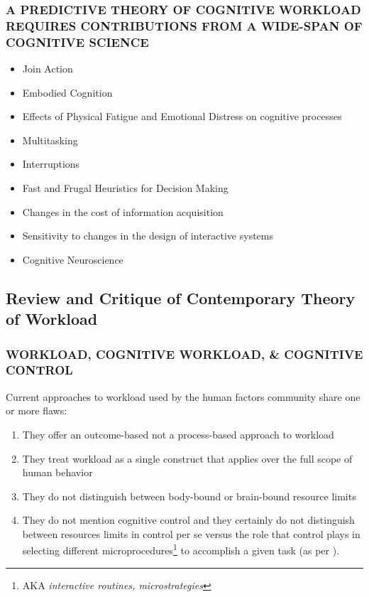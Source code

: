 \documentclass{beamer}
\begin{document}
 \begin{frame}
	\frametitle{A PREDICTIVE THEORY OF COGNITIVE WORKLOAD REQUIRES CONTRIBUTIONS FROM A WIDE-SPAN OF COGNITIVE SCIENCE}

	\begin{itemize}
		\item Join Action
		\item Embodied Cognition
		\item Effects of Physical Fatigue and Emotional Distress on cognitive processes
		\item Multitasking
		\item Interruptions
		\item Fast and Frugal Heuristics for Decision Making
		\item Changes in the cost of information acquisition
		\item Sensitivity to changes in the design of interactive systems
		\item Cognitive Neuroscience
	\end{itemize}
\end{frame}


\subsection{Review and Critique of Contemporary Theory of Workload}

\begin{frame}[label=4flaws]
	\frametitle{WORKLOAD, COGNITIVE WORKLOAD, \& COGNITIVE CONTROL}
	Current approaches to workload used by the human factors community share one or more flaws:
	\pause
	\begin{enumerate}[<+-| alert@+>]
		\item They offer an outcome-based not a process-based approach to workload
		\item They treat workload as a single construct that applies over the full scope of human behavior
		\item They do not distinguish between body-bound or brain-bound resource limits
		\item They do not mention cognitive control and they certainly do not distinguish between resources limits in control per se versus the role that control plays in selecting different \alert{microprocedures}\footnote[frame]{AKA \emph{interactive routines, microstrategies}} to accomplish a given task (as per ).
	\end{enumerate}
	\vspace{.7cm}
\end{frame}
\end{document}
